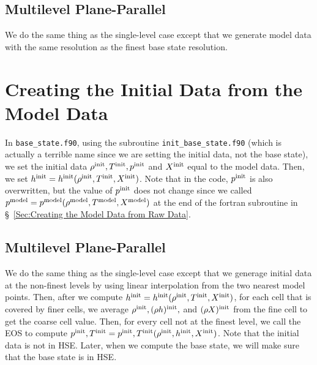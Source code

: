 \documentclass[11pt]{article}
\def\init  {\rm init}
\def\model {\rm model}
\begin{document}
\subsection{Multilevel Plane-Parallel}
We do the same thing as the single-level case except that we generate model data with the same resolution as the finest base state resolution.
\section{Creating the Initial Data from the Model Data}
In {\tt base\_state.f90}, using the subroutine {\tt init\_base\_state.f90} (which is actually a terrible name since we are setting the initial data, not the base state), we set the initial data $\rho^{\init}, T^{\init}, p^{\init}$ and $X^{\init}$ equal to the model data.  Then, we set $h^{\init} = h^{\init}(\rho^{\init},T^{\init},X^{\init})$.  Note that in the code, $p^{\init}$ is also overwritten, but the value of $p^{\init}$ does not change since we called $p^{\model} = p^{\model}(\rho^{\model},T^{\model},X^{\model})$ at the end of the fortran subroutine in \S~\ref{Sec:Creating the Model Data from Raw Data}.
\subsection{Multilevel Plane-Parallel}
We do the same thing as the single-level case except that we generage initial data at the non-finest levels by using linear interpolation from the two nearest model points.  Then, after we compute $h^{\init} = h^{\init}(\rho^{\init},T^{\init},X^{\init})$, for each cell that is covered by finer cells, we average $\rho^{\init}, (\rho h)^{\init},$ and $(\rho X)^{\init}$ from the fine cell to get the coarse cell value.  Then, for every cell not at the finest level, we call the EOS to compute $p^{\init},T^{\init} = p^{\init},T^{\init}(\rho^{\init},h^{\init},X^{\init})$.  Note that the initial data is not in HSE.  Later, when we compute the base state, we will make sure that the base state is in HSE.
\end{document}
